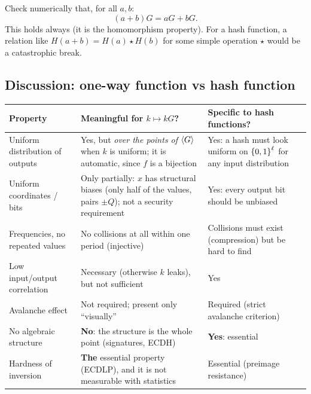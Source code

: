 Check numerically that, for all $a, b$:
\[
  (a + b)G = aG + bG .
\]
This holds always (it is the homomorphism property). For a hash function, a relation like $H(a + b) = H(a) \star H(b)$ for some simple operation $\star$ would be a catastrophic break.

\subsection{Discussion: one-way function vs hash function}

\begin{center}
  \small
  \begin{tabularx}{\textwidth}{l X X}
    \toprule
    Property & Meaningful for $k \mapsto kG$? & Specific to hash functions? \\
    \midrule
    Uniform distribution of outputs & Yes, but \textit{over the points of $\left\langle G \right\rangle$} when $k$ is uniform; it is automatic, since $f$ is a bijection & Yes: a hash must look uniform on $\left\{0,1\right\}^\ell$ for any input distribution \\
    Uniform coordinates / bits & Only partially: $x$ has structural biases (only half of the values, pairs $\pm Q$); not a security requirement & Yes: every output bit should be unbiased \\
    Frequencies, no repeated values & No collisions at all within one period (injective) & Collisions must exist (compression) but be hard to find \\
    Low input/output correlation & Necessary (otherwise $k$ leaks), but not sufficient & Yes \\
    Avalanche effect & Not required; present only ``visually'' & Required (strict avalanche criterion) \\
    No algebraic structure & \textbf{No}: the structure is the whole point (signatures, ECDH) & \textbf{Yes}: essential \\
    Hardness of inversion & \textbf{The} essential property (ECDLP), and it is not measurable with statistics & Essential (preimage resistance) \\
    \bottomrule
  \end{tabularx}
\end{center}

